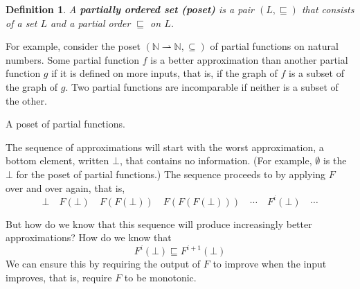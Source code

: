 \documentclass{tufte-handout}
\newcommand{\pto}[0]{\rightharpoonup}
\newtheorem{definition}{Definition}%
\begin{document}
\begin{definition}
  A \textbf{\emph{partially ordered set (poset)}} is a pair
  $(L,\sqsubseteq)$ that consists of a set $L$ and a partial order
  $\sqsubseteq$ on $L$.
\end{definition}

For example, consider the poset
$(\mathbb{N}{\pto}\mathbb{N}, \subseteq)$ of partial
functions on natural numbers. Some partial function $f$ is a better
approximation than another partial function $g$ if it is defined on
more inputs, that is, if the graph of $f$ is a subset of the graph of
$g$.  Two partial functions are incomparable if neither is a subset of
the other.

\begin{marginfigure}
\centering\large
{}
\caption{A poset of partial functions.}
\label{fig:poset-of-partial-functions}
\end{marginfigure}
%
The sequence of approximations will start with the worst
approximation, a bottom element, written $\bot$, that contains no
information. (For example, $\emptyset$ is the $\bot$ for the poset of
partial functions.)
The sequence proceeds to by applying $F$ over and over again, that is,
\[
  \bot \quad F(\bot)\quad F(F(\bot))\quad F(F(F(\bot)))\quad \cdots\quad F^i(\bot)\quad \cdots
\]

But how do we know that this sequence will produce increasingly better
approximations?  How do we know that
\[
F^i(\bot) \sqsubseteq F^{i+1}(\bot)
\]
We can ensure this by requiring the output of $F$ to improve when the
input improves, that is, require $F$ to be monotonic.
\end{document}
